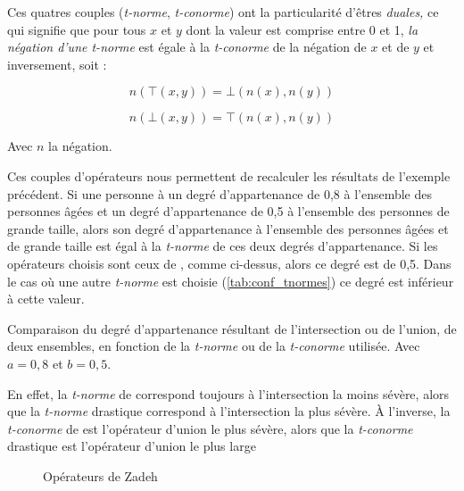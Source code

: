 Ces quatres couples (\emph{t-norme}, \emph{t-conorme}) ont la
particularité d'êtres \emph{duales,} ce qui signifie que pour tous
\(x\) et \(y\) dont la valeur est comprise entre 0 et 1, \emph{la négation
d'une \emph{t-norme}} est égale à la \emph{t-conorme} de la négation
de \(x\) et de \(y\) et inversement, soit :

\begin{equation}
  n(⊤(x,y)) = ⊥(n(x), n(y))
\end{equation}

\begin{equation}
  n(⊥(x,y)) = ⊤(n(x), n(y))
\end{equation}

Avec \(n\) la négation.

Ces couples d'opérateurs nous permettent de recalculer les résultats
de l'exemple précédent. Si une personne à un degré d'appartenance de
0,8 à l'ensemble des personnes âgées et un degré d'appartenance de 0,5
à l'ensemble des personnes de grande taille, alors son degré
d'appartenance à l'ensemble des personnes âgées et de grande taille
est égal à la \emph{t-norme} de ces deux degrés d'appartenance. Si les
opérateurs choisis sont ceux de \textcite{Zadeh1965}, comme ci-dessus,
alors ce degré est de 0,5. Dans le cas où une autre \emph{t-norme} est
choisie (\autoref{tab:conf_tnormes}) ce degré est inférieur à cette
valeur.

\begin{table}
  \centering
  
  \caption{Comparaison du degré d'appartenance résultant de
    l'intersection ou de l'union, de deux ensembles, en fonction de la
    \emph{t-norme} ou de la \emph{t-conorme} utilisée. Avec
    \(a = 0,8\) et \(b = 0,5\).}
  \label{tab:conf_tnormes}
\end{table}

En effet, la \emph{t-norme} de \textcite{Zadeh1965} correspond
toujours à l'intersection la moins sévère, alors que la \emph{t-norme}
drastique correspond à l'intersection la plus sévère. À l'inverse, la
\emph{t-conorme} de  \textcite{Zadeh1965} est l'opérateur d'union le
plus sévère, alors que la \emph{t-conorme} drastique est l'opérateur
d'union le plus large \autocite{Bouchon-Meunier2007}

\begin{figure}
  \begin{center}
    \caption{Opérateurs de Zadeh}
    \label{fig:zadeh_op}
  \end{center}
\end{figure}

